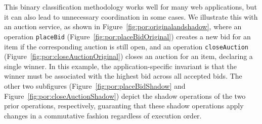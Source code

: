 \begin{figure*}[t!]
\begin{minipage}[t]{0.495\textwidth}
\centering
{}
\\
\end{minipage}
\hspace{2mm}
\begin{minipage}[t]{0.495\textwidth}
\centering
{}
\\
\end{minipage}
\caption{Pseudocode for the original and shadow operations of the {\tt placeBid} and {\tt closeAuction} transactions in RUBiS.}
\label{fig:por:originalandshadow}
\end{figure*}

This binary classification methodology works well for many web applications,
but it can also lead to unnecessary coordination in some cases.
We illustrate this with an auction service, as shown in Figure~\ref{fig:por:originalandshadow},
 where an operation {\tt placeBid} (Figure~\ref{fig:por:placeBidOriginal}) creates
a new bid for an item if the corresponding auction is still open, and an
operation {\tt closeAuction} (Figure~\ref{fig:por:closeAuctionOriginal}) closes
an auction for an item, declaring a single winner. In this example, the application-specific invariant
is that the winner must be associated with the highest bid across all accepted bids. The
other two subfigures (Figure~\ref{fig:por:placeBidShadow} and Figure~\ref{fig:por:closeAuctionShadow})
depict the shadow operations of the two prior operations, respectively, guaranting
that these shadow operations apply changes in a commutative fashion regardless of execution order.

